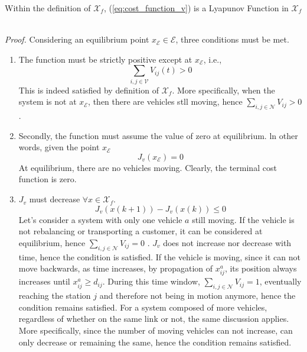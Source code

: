 \begin{proposition}{}
	Within the definition of $\mathcal{X}_f$, (\ref{eq:cost_function_v}) is a Lyapunov Function in $\mathcal{X}_f$
\end{proposition}\\
\textit{Proof. } Considering an equilibrium point $x_{\mathcal{E}}\in\mathcal{E}$, three conditions must be met.\\
\begin{enumerate}
	\item The function must be strictly positive except at $x_{\mathcal{E}}$, i.e.,
	\begin{equation*}
		\sum_{i,j \in \mathcal{V}}V_{ij}(t) >0
	\end{equation*}
	This is indeed satisfied by definition of $\mathcal{X}_f$. More specifically, when the system is not at $x_{\mathcal{E}}$, then there are vehicles stll moving, hence $\sum_{i,j \in \mathcal{N}}V_{ij} >0$. 
	\item Secondly, the function must assume the value of zero at equilibrium. ln other words, given the point $x_{\mathcal{E}}$
	\begin{equation*}
		J_v(x_{\mathcal{E}}) = 0
	\end{equation*}
	At equilibrium, there are no vehicles moving. Clearly, the terminal cost function is zero. 
	\item $J_v$ must decrease $\forall x \in \mathcal{X}_f$. 
	\begin{equation*}
		J_v(x(k+1)) - J_v(x(k))\leq 0
	\end{equation*}
	Let's consider a system with only one vehicle $a$ still moving. If the vehicle is not rebalancing or transporting a customer, it can be considered at equilibrium, hence $\sum_{i,j \in \mathcal{N}}V_{ij} =0$ . $J_v$ does not increase nor decrease with time, hence the condition is satisfied. If the vehicle is moving, since it can not move backwards, as time increases, by propagation of $x_{ij}^a$, its position always increases until $x_{ij}^a \ge d_{ij}$. During this time window, $\sum_{i,j \in \mathcal{N}}V_{ij} =1$, eventually reaching the station $j$ and therefore not being in motion anymore, hence the condition remains satisfied. For a system composed of more vehicles, regardless of whether on the same link or not, the same discussion applies. More specifically, since the number of moving vehicles can not increase, can only decrease or remaining the same, hence the condition remains satisfied.
\end{enumerate}


